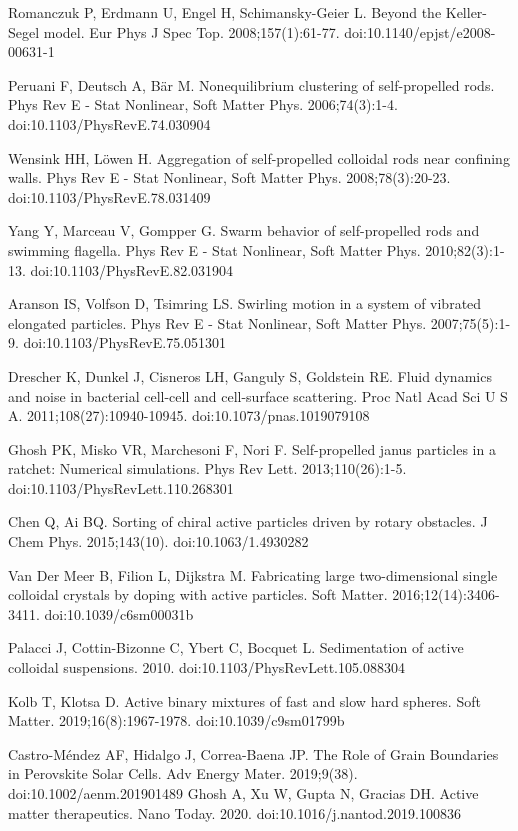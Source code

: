 \documentclass[11pt]{article}
\begin{document}
\begin{thebibliography}{9}
Romanczuk P, Erdmann U, Engel H, Schimansky-Geier L. Beyond the Keller-Segel model. Eur Phys J Spec Top. 2008;157(1):61-77. doi:10.1140/epjst/e2008-00631-1

Peruani F, Deutsch A, Bär M. Nonequilibrium clustering of self-propelled rods. Phys Rev E - Stat Nonlinear, Soft Matter Phys. 2006;74(3):1-4. doi:10.1103/PhysRevE.74.030904

Wensink HH, Löwen H. Aggregation of self-propelled colloidal rods near confining walls. Phys Rev E - Stat Nonlinear, Soft Matter Phys. 2008;78(3):20-23. doi:10.1103/PhysRevE.78.031409

Yang Y, Marceau V, Gompper G. Swarm behavior of self-propelled rods and swimming flagella. Phys Rev E - Stat Nonlinear, Soft Matter Phys. 2010;82(3):1-13. doi:10.1103/PhysRevE.82.031904

Aranson IS, Volfson D, Tsimring LS. Swirling motion in a system of vibrated elongated particles. Phys Rev E - Stat Nonlinear, Soft Matter Phys. 2007;75(5):1-9. doi:10.1103/PhysRevE.75.051301

Drescher K, Dunkel J, Cisneros LH, Ganguly S, Goldstein RE. Fluid dynamics and noise in bacterial cell-cell and cell-surface scattering. Proc Natl Acad Sci U S A. 2011;108(27):10940-10945. doi:10.1073/pnas.1019079108

Ghosh PK, Misko VR, Marchesoni F, Nori F. Self-propelled janus particles in a ratchet: Numerical simulations. Phys Rev Lett. 2013;110(26):1-5. doi:10.1103/PhysRevLett.110.268301

Chen Q, Ai BQ. Sorting of chiral active particles driven by rotary obstacles. J Chem Phys. 2015;143(10). doi:10.1063/1.4930282

Van Der Meer B, Filion L, Dijkstra M. Fabricating large two-dimensional single colloidal crystals by doping with active particles. Soft Matter. 2016;12(14):3406-3411. doi:10.1039/c6sm00031b

Palacci J, Cottin-Bizonne C, Ybert C, Bocquet L. Sedimentation of active colloidal suspensions. 2010. doi:10.1103/PhysRevLett.105.088304

Kolb T, Klotsa D. Active binary mixtures of fast and slow hard spheres. Soft Matter. 2019;16(8):1967-1978. doi:10.1039/c9sm01799b

Castro-Méndez AF, Hidalgo J, Correa-Baena JP. The Role of Grain Boundaries in Perovskite Solar Cells. Adv Energy Mater. 2019;9(38). doi:10.1002/aenm.201901489
Ghosh A, Xu W, Gupta N, Gracias DH. Active matter therapeutics. Nano Today. 2020. doi:10.1016/j.nantod.2019.100836


\end{thebibliography}
\end{document}
